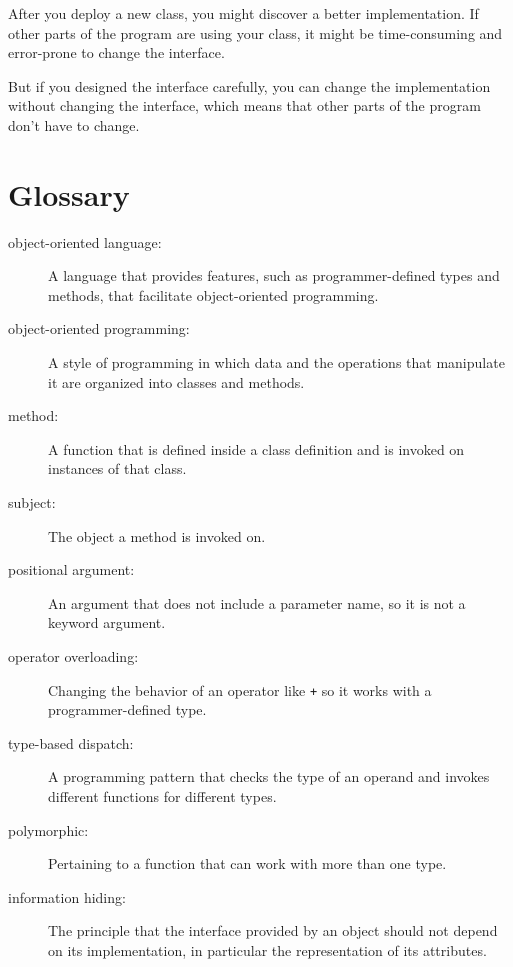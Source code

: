 After you deploy a new class, you might discover a better
implementation.  If other parts of the program are using your
class, it might be time-consuming and error-prone to change the
interface.

But if you designed the interface carefully, you can
change the implementation without changing the interface, which
means that other parts of the program don't have to change.


\section{Glossary}

\begin{description}

\item[object-oriented language:] A language that provides features,
  such as programmer-defined types and methods, that facilitate
  object-oriented programming.

\item[object-oriented programming:] A style of programming in which
data and the operations that manipulate it are organized into classes
and methods.

\item[method:] A function that is defined inside a class definition and
is invoked on instances of that class.

\item[subject:] The object a method is invoked on.

\item[positional argument:]  An argument that does not include
a parameter name, so it is not a keyword argument.

\item[operator overloading:] Changing the behavior of an operator like
{\tt +} so it works with a programmer-defined type.

\item[type-based dispatch:] A programming pattern that checks the type
of an operand and invokes different functions for different types.

\item[polymorphic:] Pertaining to a function that can work with more
  than one type.

\item[information hiding:] The principle that the interface provided
by an object should not depend on its implementation, in particular
the representation of its attributes.

\end{description}


